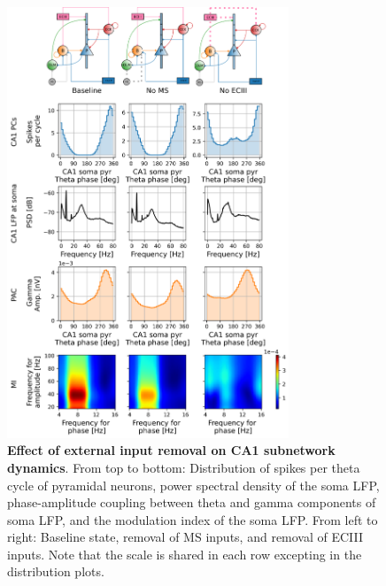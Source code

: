 \documentclass[../main.tex]{subfiles}
\begin{document}
\begin{figure}[!htb]
    \centering
    \includegraphics[width=0.75\textwidth]{chapter4/figures/removing_external_inputs/removing_inputs_lfp_ca1_pt1.png}
    \caption{\textbf{Effect of external input removal on CA1 subnetwork dynamics}.
    From top to bottom: Distribution of spikes per theta cycle of pyramidal neurons, power spectral density of the soma LFP, phase-amplitude coupling between theta and gamma components of soma LFP, and the modulation index of the soma LFP.
    From left to right: Baseline state, removal of MS 
    inputs, and removal of ECIII inputs.
    Note that the scale is shared in each row excepting in the distribution plots.}
    \label{fig:no-inputs-ca1}
\end{figure}
\end{document}
